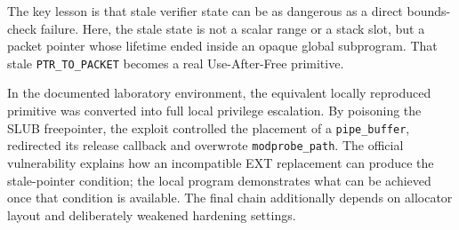 \documentclass[../main.tex]{subfiles}
\begin{document}
The key lesson is that stale verifier state can be as dangerous as a direct bounds-check failure. Here, the stale state is not a scalar range or a stack slot, but a packet pointer whose lifetime ended inside an opaque global subprogram. That stale \texttt{PTR\_TO\_PACKET} becomes a real Use-After-Free primitive.

In the documented laboratory environment, the equivalent locally reproduced primitive was converted into full local privilege escalation. By poisoning the SLUB freepointer, the exploit controlled the placement of a \texttt{pipe\_buffer}, redirected its release callback and overwrote \texttt{modprobe\_path}. The official vulnerability explains how an incompatible EXT replacement can produce the stale-pointer condition; the local program demonstrates what can be achieved once that condition is available. The final chain additionally depends on allocator layout and deliberately weakened hardening settings.
\end{document}

